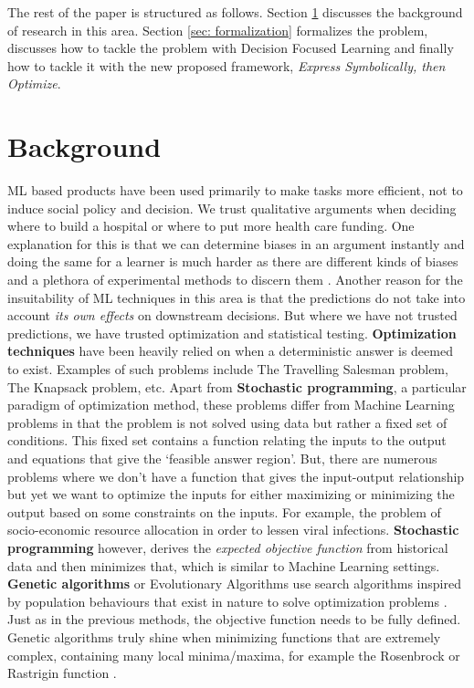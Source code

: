 \documentclass[12pt, letterpaper]{article}
\begin{document}
The rest of the paper is structured as follows. Section \ref{sec: Background} discusses
the background of research in this area. Section \ref{sec: formalization} formalizes the problem, discusses how to tackle
the problem with Decision Focused Learning and finally how to tackle it with the
new proposed framework, \textit{Express Symbolically, then Optimize}.


\section{Background}
\label{sec: Background}
ML based products have been used primarily to make tasks more efficient, not to
induce social policy and decision. We trust qualitative arguments when deciding
where to build a hospital or where to put more health care funding. One
explanation for this is that we can determine biases in an argument instantly
and doing the same for a learner is much harder as there are different kinds of
biases and a plethora of experimental methods to discern them \cite{bias}.
Another reason for the insuitability of ML techniques in this area is that the
predictions do not take into account \textit{its own effects} on downstream
decisions. But where we have not trusted predictions, we have trusted
optimization and statistical testing. \textbf{Optimization techniques} have been
heavily relied on when a deterministic answer is deemed to exist. Examples of
such problems include The Travelling Salesman problem, The Knapsack problem,
etc. Apart from \textbf{Stochastic programming}, a particular paradigm of
optimization method, these problems differ from Machine Learning problems in
that the problem is not solved using data but rather a fixed set of conditions.
This fixed set contains a function relating the inputs to the output and
equations that give the `feasible answer region'. But, there are numerous
problems where we don't have a function that gives the input-output relationship
but yet we want to optimize the inputs for either maximizing or minimizing the
output based on some constraints on the inputs. For example, the problem of
socio-economic resource allocation in order to lessen viral infections.
\textbf{Stochastic programming} however, derives the \textit{expected objective
function} from historical data and then minimizes that, which is similar to
Machine Learning settings. {\textbf{Genetic algorithms}} or Evolutionary
Algorithms use search algorithms inspired by population behaviours that exist in
nature to solve optimization problems \cite{Kruse2022}. Just as in the previous
methods, the objective function needs to be fully defined. Genetic algorithms
truly shine when minimizing functions that are extremely complex, containing
many local minima/maxima, for example the Rosenbrock or Rastrigin function
\cite{test_functions}.
\end{document}

